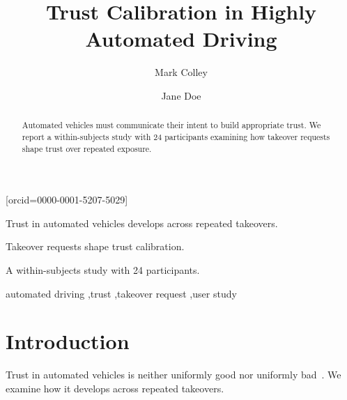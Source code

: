 \documentclass[a4paper,fleqn]{cas-dc}
\begin{document}

\title [mode = title]{Trust Calibration in Highly Automated Driving}
\tnotemark[1]

\author[1]{Mark Colley}[orcid=0000-0001-5207-5029]
\cormark[1]

\author[2]{Jane Doe}




\begin{abstract}
Automated vehicles must communicate their intent to build appropriate trust.
We report a within-subjects study with 24 participants examining how takeover
requests shape trust over repeated exposure.
\end{abstract}

\begin{highlights}
\item Trust in automated vehicles develops across repeated takeovers.
\item Takeover requests shape trust calibration.
\item A within-subjects study with 24 participants.
\end{highlights}

\begin{keywords}
automated driving \sep trust \sep takeover request \sep user study
\end{keywords}

\maketitle

\section{Introduction}
Trust in automated vehicles is neither uniformly good nor uniformly
bad~\citep{lee2004trust}. We examine how it develops across repeated takeovers.
\end{document}
